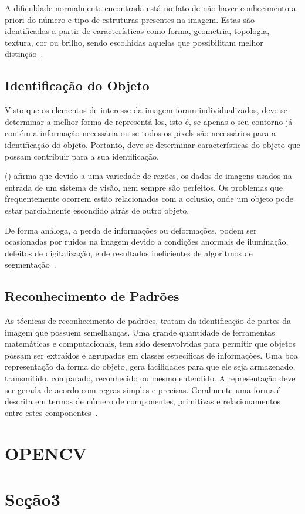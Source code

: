 A dificuldade normalmente encontrada está no fato de não haver conhecimento a priori do número e tipo de estruturas presentes na imagem. Estas são identificadas a partir de características como forma, geometria, topologia, textura, cor ou brilho, sendo escolhidas aquelas que possibilitam melhor distinção~\cite{heinen2004navegaccao}.

\subsection{Identificação do Objeto}
\label{subsec:idObjeto}

Visto que os elementos de interesse da imagem foram individualizados, deve-se determinar a melhor forma de representá-los, isto é, se apenas o seu contorno já contém a informação necessária ou se todos os pixels são necessários para a identificação do objeto. Portanto, deve-se determinar características do objeto que possam contribuir para a sua identificação.

\citeauthor{rudek2001visao} (\citeyear{rudek2001visao}) afirma que devido a uma variedade de razões, os dados de imagens usados na entrada de um sistema de visão, nem sempre são perfeitos. Os problemas que frequentemente ocorrem estão relacionados com a oclusão, onde um objeto pode estar parcialmente escondido atrás de outro objeto. 

De forma análoga, a perda de informações ou deformações, podem ser ocasionadas por ruídos na imagem devido a condições anormais de iluminação, defeitos de digitalização, e de resultados ineficientes de algoritmos de segmentação~\cite{beis1999indexing}.

\subsection{Reconhecimento de Padrões}
\label{subsec:recPadroes}

As técnicas de reconhecimento de padrões, tratam da identificação de partes da imagem que possuem semelhanças. Uma grande quantidade de ferramentas matemáticas e computacionais, tem sido desenvolvidas para permitir que objetos possam ser extraídos e agrupados em classes específicas de informações. Uma boa representação da forma do objeto, gera facilidades para que ele seja armazenado, transmitido, comparado, reconhecido ou mesmo entendido. A representação deve ser gerada de acordo com regras simples e precisas. Geralmente uma forma é descrita em termos de número de componentes, primitivas e relacionamentos entre estes componentes~\cite{rudek2001visao}.

\section{OPENCV}
\label{sec:openCV}



\section{Seção3}
\label{sec:EstimarF0}


 
